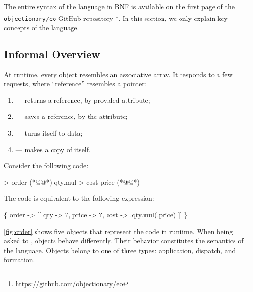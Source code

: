 


The entire syntax of the \eolang{} language in BNF is available on the first page of the \texttt{objectionary/eo} GitHub repository%
  \footnote{\url{https://github.com/objectionary/eo}}.
In this section, we only explain key concepts of the language.

\subsection{Informal Overview}

At runtime, every \eolang{} object resembles an associative array.
It responds to a few requests, where ``reference'' resembles a pointer:
\begin{enumerate}
  \item {} --- returns a reference, by provided attribute;
  \item {} --- saves a reference, by the attribute;
  \item {} --- turns itself to data;
  \item {} --- makes a copy of itself.
\end{enumerate}

Consider the following code:

\begin{ffcode}
 > order (*@\label{ln:order-start}@*)
  qty.mul > cost
    price (*@\label{ln:order-stop}@*)
\end{ffcode}

The code is equivalent to the following \phic{} expression:
\begin{phiquation*}
\Big\{ order -> [[ qty -> ?, price -> ?, cost -> \xi.qty.mul(\xi.price) ]] \Big\}
\end{phiquation*}

\cref{fig:order} shows five objects that represent the code in runtime.
When being asked to , objects behave differently.
Their behavior constitutes the semantics of the language.
Objects belong to one of three types: application, dispatch, and formation.


